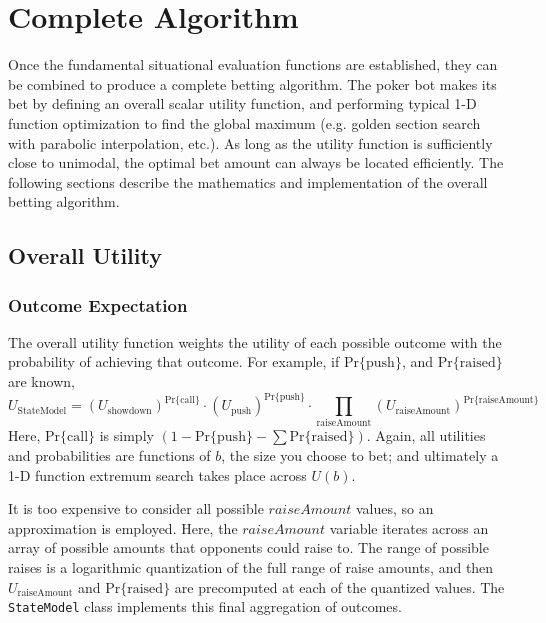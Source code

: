 
\clearpage




\chapter{Complete Algorithm}
\label{sec:CompleteAlgorithm}

Once the fundamental situational evaluation functions are established, they can be combined to produce a complete betting algorithm.
The poker bot makes its bet by defining an overall scalar utility function, and performing typical 1-D function optimization to find the global maximum (e.g. golden section search with parabolic interpolation, etc.).
As long as the utility function is sufficiently close to unimodal, the optimal bet amount can always be located efficiently.
The following sections describe the mathematics and implementation of the overall betting algorithm.

\section{Overall Utility}
\label{sec:OverallUtility}


\subsection{Outcome Expectation}

The overall utility function weights the utility of each possible outcome with the probability of achieving that outcome.
For example, if $\mathrm{Pr\{push}\}$, and $\mathrm{Pr\{raised}\}$ are known, %
\[
U_{\mathrm{StateModel}} = \left(U_{\mathrm{showdown}}\right)^{\mathrm{Pr\{call\}}} \cdot \left(U_{\mathrm{push}}\right)^{\mathrm{Pr\{push}\}} \cdot \prod_{\mathrm{raiseAmount}} \left(U_{\mathrm{raiseAmount}}\right)^{\mathrm{Pr\{raiseAmount}\}}
\]
Here, $\mathrm{Pr\{call\}}$ is simply $\left(1 - \mathrm{Pr\{push}\} - \sum \mathrm{Pr\{raised}\}\right)$.
Again, all utilities and probabilities are functions of $b$, the size you choose to bet; and ultimately a 1-D function extremum search takes place across $U\left(b\right)$.

It is too expensive to consider all possible $raiseAmount$ values, so an approximation is employed.
Here, the $raiseAmount$ variable iterates across an array of possible amounts that opponents could raise to.
The range of possible raises is a logarithmic quantization of the full range of raise amounts, and then $U_{\mathrm{raiseAmount}}$ and $\mathrm{Pr\{raised}\}$ are precomputed at each of the quantized values.
The \texttt{StateModel} class implements this final aggregation of outcomes.

